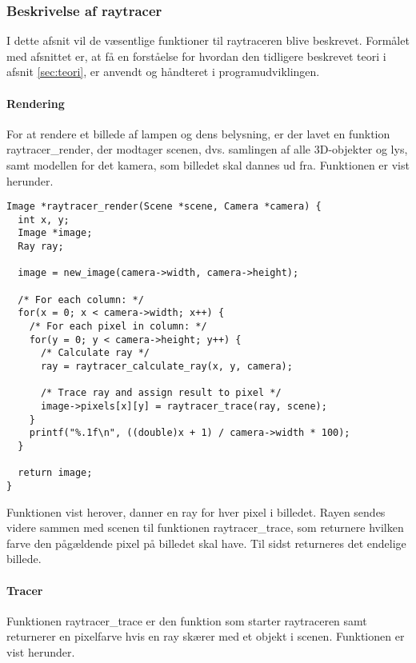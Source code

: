 \subsubsection{Beskrivelse af raytracer}
I dette afsnit vil de væsentlige funktioner til raytraceren blive beskrevet. Formålet med afsnittet er, at få en forståelse for hvordan den tidligere beskrevet teori i afsnit \ref{sec:teori}, er anvendt og håndteret i programudviklingen.


\paragraph{Rendering}
For at rendere et billede af lampen og dens belysning, er der lavet en funktion raytracer\_render, der modtager scenen, dvs. samlingen af alle 3D-objekter og lys, samt modellen for det kamera, som billedet skal dannes ud fra. Funktionen er vist herunder.

\begin{lstlisting}[style=Cstyle, caption=Funktionen der rendere billedet af scenen med et kameras perspektiv]
Image *raytracer_render(Scene *scene, Camera *camera) {
  int x, y;
  Image *image;
  Ray ray;

  image = new_image(camera->width, camera->height);
  
  /* For each column: */
  for(x = 0; x < camera->width; x++) {
    /* For each pixel in column: */
    for(y = 0; y < camera->height; y++) {
      /* Calculate ray */
      ray = raytracer_calculate_ray(x, y, camera);
      
      /* Trace ray and assign result to pixel */
      image->pixels[x][y] = raytracer_trace(ray, scene);
    }
    printf("%.1f\n", ((double)x + 1) / camera->width * 100);
  }

  return image;
}
\end{lstlisting}

Funktionen vist herover, danner en ray for hver pixel i billedet. Rayen sendes videre sammen med scenen til funktionen raytracer\_trace, som returnere hvilken farve den pågældende pixel på billedet skal have. Til sidst returneres det endelige billede.

\paragraph{Tracer}
Funktionen raytracer\_trace er den funktion som starter raytraceren samt returnerer en pixelfarve hvis en ray skærer med et objekt i scenen. Funktionen er vist herunder.  

